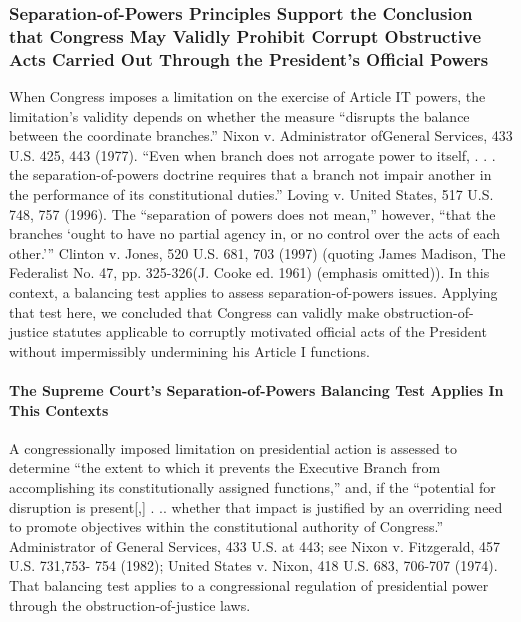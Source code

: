\subsubsection{Separation-of-Powers Principles Support the Conclusion that Congress May Validly Prohibit Corrupt Obstructive Acts Carried Out Through the President’s Official Powers}

When Congress imposes a limitation on the exercise of Article IT powers, the limitation’s validity depends on whether the measure “disrupts the balance between the coordinate branches.” Nixon v. Administrator ofGeneral Services, 433 U.S. 425, 443 (1977).
“Even when branch does not arrogate power to itself, . . . the separation-of-powers doctrine requires that a branch not impair another in the performance of its constitutional duties.” Loving v. United States, 517 U.S. 748, 757 (1996). The “separation of powers does not mean,” however, “that the branches ‘ought to have no partial agency in, or no control over the acts of each other.’” Clinton v. Jones, 520 U.S. 681, 703 (1997) (quoting James Madison, The Federalist No. 47, pp. 325-326(J. Cooke ed. 1961) (emphasis omitted)).
In this context, a balancing test applies to assess separation-of-powers issues.
Applying that test here, we concluded that Congress can validly make obstruction-of-justice statutes applicable to corruptly motivated official acts of the President without impermissibly undermining his Article I functions.

\paragraph{The Supreme Court’s Separation-of-Powers Balancing Test Applies In This Contexts}

A congressionally imposed limitation on presidential action is assessed to determine “the extent to which it prevents the Executive Branch from accomplishing its constitutionally assigned functions,” and, if the “potential for disruption is present[,] . .. whether that impact is justified by an overriding need to promote objectives within the constitutional authority of Congress.”
Administrator of General Services, 433 U.S. at 443; see Nixon v. Fitzgerald, 457 U.S. 731,753- 754 (1982); United States v. Nixon, 418 U.S. 683, 706-707 (1974).
That balancing test applies to a congressional regulation of presidential power through the obstruction-of-justice laws.%

